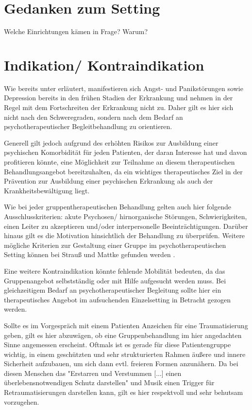 \section{Gedanken zum Setting}
Welche Einrichtungen kämen in Frage? Warum? 

\section{Indikation/ Kontraindikation}
Wie bereits unter \label{psychische_komorbiditaet} erläutert, manifestieren sich Angst- und Panikstörungen sowie Depression bereits in den frühen Stadien der Erkrankung und nehmen in der Regel mit dem Fortschreiten der Erkrankung nicht zu. Daher gilt es hier sich nicht nach den Schweregraden, sondern nach dem Bedarf an psychotherapeutischer Begleitbehandlung zu orientieren. 

Generell gilt jedoch aufgrund des erhöhten Risikos zur Ausbildung einer psychischen Komorbidität für jeden Patienten, der daran Interesse hat und davon profitieren könnte, eine Möglichkeit zur Teilnahme an diesem therapeutischen Behandlungsangebot bereitzuhalten, da ein wichtiges therapeutisches Ziel in der Prävention zur Ausbildung einer psychischen Erkrankung als auch der Krankheitsbewältigung liegt.

Wie bei jeder gruppentherapeutischen Behandlung gelten auch hier folgende Ausschlusskriterien: akute Psychosen/ hirnorganische Störungen, Schwierigkeiten, einen Leiter zu akzeptieren und/oder interpersonelle Beeinträchtigungen. Darüber hinaus gilt es die Motivation hinsichtlich der Behandlung zu überprüfen. Weitere mögliche Kriterien zur Gestaltung einer Gruppe im psychotherapeutischen Setting können bei Strauß und Mattke gefunden werden \autocite[vgl.][78-88]{mattke2007}.

Eine weitere Kontraindikation könnte fehlende Mobilität bedeuten, da das Gruppenangebot selbstständig oder mit Hilfe aufgesucht werden muss. Bei gleichzeitigem Bedarf an psychotherapeutischer Begleitung sollte hier ein therapeutisches Angebot im aufsuchenden Einzelsetting in Betracht gezogen werden.

Sollte es im Vorgespräch mit einem Patienten Anzeichen für eine Traumatisierung geben, gilt es hier abzuwägen, ob eine Gruppenbehandlung im hier angedachten Sinne angemessen erscheint. Oftmals ist es gerade für diese Patientengruppe wichtig, in einem geschützten und sehr strukturierten Rahmen äußere und innere Sicherheit aufzubauen, um sich dann evtl. freieren Formen anzunähern. Da bei diesen Menschen das "Erstarren und Verstummen [...] einen überlebensnotwendigen Schutz darstellen" \autocite[68]{rittner2012} und Musik einen Trigger für Retraumatisierungen darstellen kann, gilt es hier respektvoll und sehr behutsam vorzugehen.

